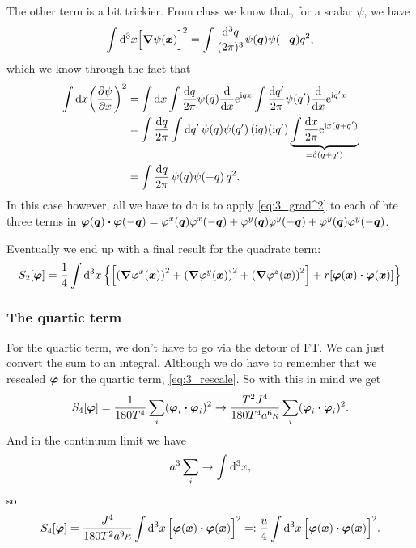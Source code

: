 \documentclass[11pt,letter, swedish, english
]{article}
\begin{document}
The other term is a bit trickier. From class we know that, for a
scalar $\psi$, we have
\begin{equation}\label{eq:3_grad^2}
\int\rd^3x \Big[\grad\psi(\vb*x)\Big]^2
=\int\frac{\rd^3q}{(2\pi)^3}\psi(\vb*q)\psi(-\vb*q)q^2,
\end{equation}
which we know through the fact that
\begin{equation}
\begin{aligned}
\int\rd{x}\qty(\pdv{\psi}{x})^2=&
\int\rd{x}\int\frac{\rd{q}}{2\pi}\psi(q)\dv{x}\ee^{\ii qx}
\int\frac{\rd{q'}}{2\pi}\psi(q')\dv{x}\ee^{\ii q'x}\\
=&\int\frac{\rd{q}}{2\pi}\int\rd{q'}\,\psi(q)\psi(q')\,(\ii q)(\ii q')
\underbrace{\int\frac{\rd{x}}{2\pi}\ee^{\ii x(q+q')}}_{=\delta(q+q')}\\
=&\int\frac{\rd{q}}{2\pi}\,\psi(q)\psi(-q)\,q^2.
\end{aligned}
\end{equation}
In this case however, all we have to do is to apply
\eqref{eq:3_grad^2} to each of hte three terms in 
$\vb*\varphi(\vb*q)\vdot\vb*\varphi(-\vb*q)
=\varphi^x(\vb*q)\varphi^x(-\vb*q)
+\varphi^y(\vb*q)\varphi^y(-\vb*q)+
\varphi^y(\vb*q)\varphi^y(-\vb*q)$. 

Eventually we end up with a final result for the quadratc term:
\begin{equation}
S_2[\vb*\varphi]=\frac{1}{4}\int\rd^3x\,
\qty{\qty[\qty(\grad\varphi^x(\vb*x))^2
+\qty(\grad\varphi^y(\vb*x))^2
+\qty(\grad\varphi^z(\vb*x))^2]
+r[\vb*\varphi(\vb*x)\vdot\vb*\varphi(\vb*x)]}
\end{equation}


\subsubsection{The quartic term}
For the quartic term, we don't have to go via the detour of FT. We can
just convert the sum to an integral. Although we do have to remember that we
rescaled $\vb*\varphi$ for the quartic term, \eqref{eq:3_rescale}. So
with this in mind we get
\begin{equation}
S_4[\vb*\varphi]=
\frac{1}{180T^4}\sum_i(\vb*\varphi_i\vdot\vb*\varphi_i)^2
\to \frac{T^2J^4}{180T^4a^6\kappa}
\sum_i(\vb*\varphi_i\vdot\vb*\varphi_i)^2.
\end{equation}
And in the continuum limit we have
\begin{equation}
a^3\sum_i\to\int\rd^3x,
\end{equation}
so 
\begin{equation}
S_4[\vb*\varphi]=\frac{J^4}{180T^2a^9\kappa}
\int\rd^3x\,\Big[\vb*\varphi(\vb*x)\vdot\vb*\varphi(\vb*x)\Big]^2
=:\frac{u}{4}
\int\rd^3x\,\Big[\vb*\varphi(\vb*x)\vdot\vb*\varphi(\vb*x)\Big]^2.
\end{equation}
\end{document}

